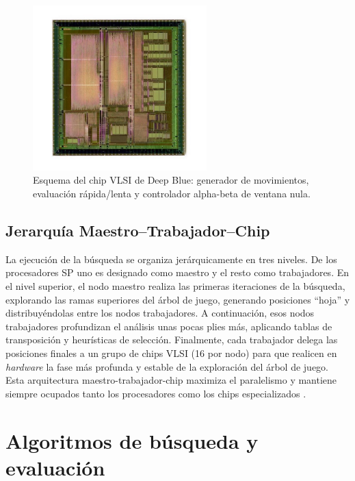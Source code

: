 \documentclass[a4paper, 12pt]{article}
\begin{document}
\begin{figure}[h!]
    \centering
    \includegraphics[width=0.6\textwidth]{assets/deep-blue-chip.jpg}
    \caption{Esquema del chip VLSI de Deep Blue: generador de movimientos, evaluación rápida/lenta y controlador alpha-beta de ventana nula.}
    \label{fig:chip_vlsi}
\end{figure}

\subsection{Jerarquía Maestro--Trabajador--Chip}


La ejecución de la búsqueda se organiza jerárquicamente en tres 
niveles. De los procesadores SP uno es designado como maestro y el resto como trabajadores.
En el nivel superior, el nodo maestro realiza las 
primeras iteraciones de la búsqueda, explorando las ramas superiores del árbol de juego, 
generando posiciones 
“hoja” y distribuyéndolas entre los nodos trabajadores. 
A continuación, esos nodos trabajadores profundizan 
el análisis unas pocas plies más, aplicando tablas de 
transposición y heurísticas de selección. Finalmente, cada 
trabajador delega las posiciones finales a un grupo de chips 
VLSI (16 por nodo) para que realicen en \emph{hardware} la fase más 
profunda y estable de la exploración del árbol de juego. 
Esta arquitectura maestro-trabajador-chip 
maximiza el paralelismo y mantiene siempre ocupados tanto los 
procesadores como los chips especializados \cite{campbell2002deep, hsu1999ibm}.










\section{Algoritmos de búsqueda y evaluación}
\end{document}

